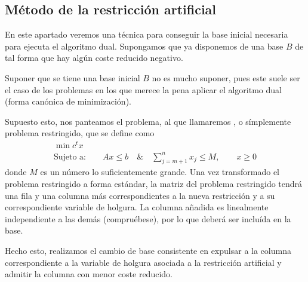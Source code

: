 \subsection{Método de la restricción artificial}
En este apartado veremos una técnica para conseguir la base inicial necesaria para ejecuta el algoritmo dual. Supongamos que ya disponemos de una base $B$ de tal forma que hay algún coste reducido negativo.
\begin{obs}[Suposiciones]
	Suponer que se tiene una base inicial $B$ no es mucho suponer, pues este suele ser el caso de los problemas en los que merece la pena aplicar el algoritmo dual (forma canónica de minimización).
\end{obs}
Supuesto esto, nos panteamos el problema, al que llamaremos , o símplemente problema restringido, que se define como
\begin{equation*}
\begin{array}{c}
\min c^tx\\
\text{Sujeto a:}\qquad Ax\leq b\quad \&\quad \sum_{j=m+1}^{n}x_j\leq M,\qquad x\geq 0
\end{array}
\end{equation*}
donde $M$ es un número lo suficientemente grande. Una vez transformado el problema restringido a forma estándar, la matriz del problema restringido tendrá una fila y una columna más correspondientes a la nueva restricción y a su correspondiente variable de holgura. La columna añadida es linealmente independiente a las demás (compruébese), por lo que deberá ser incluída en la base.

Hecho esto, realizamos el cambio de base consistente en expulsar a la columna correspondiente a la variable de holgura asociada a la restricción artificial y admitir la columna con menor coste reducido.

